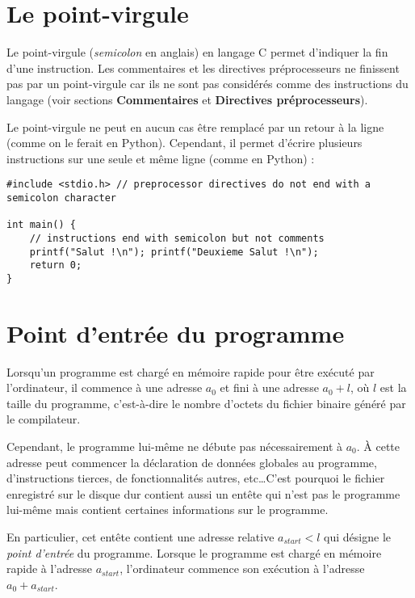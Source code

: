 \documentclass[../../../main.tex]{subfiles}
\begin{document}
\section{Le point-virgule}
Le point-virgule (\textit{semicolon} en anglais) en langage C permet d'indiquer la fin d'une instruction. Les commentaires et les directives préprocesseurs ne finissent pas par un point-virgule car ils ne sont pas considérés comme des instructions du langage (voir sections \textbf{Commentaires} et \textbf{Directives préprocesseurs}).
 
Le point-virgule ne peut en aucun cas être remplacé par un retour à la ligne (comme on le ferait en Python). Cependant, il permet d'écrire plusieurs instructions sur une seule et même ligne (comme en Python) :
\begin{verbatim}
#include <stdio.h> // preprocessor directives do not end with a semicolon character

int main() {
	// instructions end with semicolon but not comments
	printf("Salut !\n"); printf("Deuxieme Salut !\n"); 
	return 0;
}
\end{verbatim}
\section{Point d'entrée du programme}
Lorsqu'un programme est chargé en mémoire rapide pour être exécuté par l'ordinateur, il commence à une adresse $a_{0}$ et fini à une adresse $a_{0} + l$, où $l$ est la taille du programme, c'est-à-dire le nombre d'octets du fichier binaire généré par le compilateur.
 
Cependant, le programme lui-même ne débute pas nécessairement à $a_{0}$. À cette adresse peut commencer la déclaration de données globales au programme, d'instructions tierces, de fonctionnalités autres, etc\dots C'est pourquoi le fichier enregistré sur le disque dur contient aussi un entête qui n'est pas le programme lui-même mais contient certaines informations sur le programme.
 
En particulier, cet entête contient une adresse relative $a_{start} < l$ qui désigne le \textit{point d'entrée} du programme. Lorsque le programme est chargé en mémoire rapide à l'adresse $a_{start}$, l'ordinateur commence son exécution à l'adresse $a_{0} + a_{start}$.
 
\end{document}
